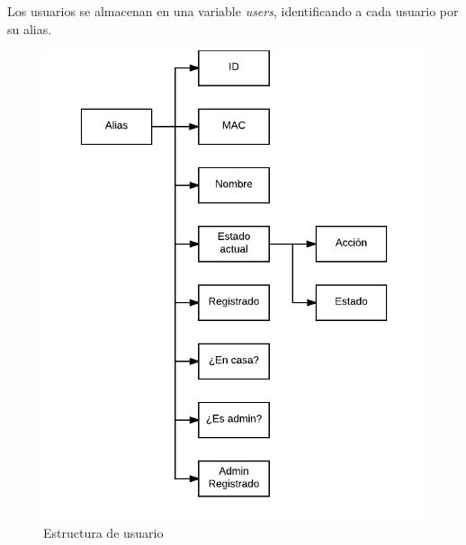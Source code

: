 \documentclass[10pt,journal,compsoc]{IEEEtran}
\begin{document}
Los usuarios se almacenan en una variable \textit{users}, identificando a cada usuario por su alias.

\begin{figure}[h]
\centering
\includegraphics[scale=0.5]{UserEst}
\caption{Estructura de usuario}
\label{fig:UserEst}
\end{figure}
\end{document}
